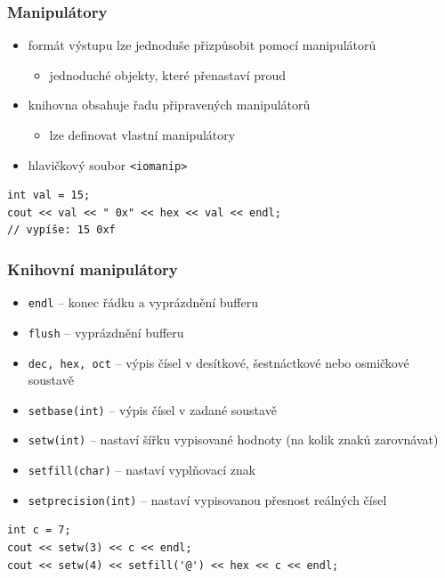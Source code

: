 \begin{frame}[fragile]
\frametitle{Manipulátory}
\begin{block}{}
\begin{itemize}
\item formát výstupu lze jednoduše přizpůsobit pomocí manipulátorů
\begin{itemize}
\item jednoduché objekty, které přenastaví proud
\end{itemize}
\item knihovna obsahuje řadu připravených manipulátorů
\begin{itemize}
\item lze definovat vlastní manipulátory
\end{itemize}
\item hlavičkový soubor \lstinline|<iomanip>|
\end{itemize}
\end{block}

\begin{yesblock}
\begin{lstlisting}
int val = 15;
cout << val << " 0x" << hex << val << endl;
// vypíše: 15 0xf
\end{lstlisting}
\end{yesblock}
\end{frame}






\begin{frame}[fragile]
\frametitle{Knihovní manipulátory}

\begin{block}{}
\begin{itemize}
\item \lstinline|endl| -- konec řádku a vyprázdnění bufferu
\item \lstinline|flush| -- vyprázdnění bufferu
\item \lstinline|dec, hex, oct| -- výpis čísel v desítkové, šestnáctkové nebo osmičkové soustavě
\item \lstinline|setbase(int)| -- výpis čísel v zadané soustavě
\item \lstinline|setw(int)| -- nastaví šířku vypisované hodnoty (na kolik znaků zarovnávat)
\item \lstinline|setfill(char)| -- nastaví vyplňovací znak
\item \lstinline|setprecision(int)| -- nastaví vypisovanou přesnost reálných čísel
\end{itemize}
\end{block}

\begin{yesblock}
\begin{lstlisting}[basicstyle=\small]
int c = 7;
cout << setw(3) << c << endl;
cout << setw(4) << setfill('@') << hex << c << endl;
\end{lstlisting}
\end{yesblock}
\end{frame}








